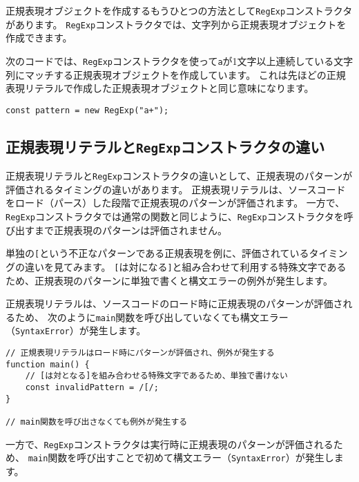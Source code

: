 正規表現オブジェクトを作成するもうひとつの方法として\texttt{RegExp}コンストラクタがあります。
\texttt{RegExp}コンストラクタでは、文字列から正規表現オブジェクトを作成できます。

次のコードでは、\texttt{RegExp}コンストラクタを使って\texttt{a}が1文字以上連続している文字列にマッチする正規表現オブジェクトを作成しています。
これは先ほどの正規表現リテラルで作成した正規表現オブジェクトと同じ意味になります。

\begin{lstlisting}
const pattern = new RegExp("a+");
\end{lstlisting}

\hypertarget{difference-regexp-literal-regexp-constructor}{%
\subsection{\texorpdfstring{正規表現リテラルと\texttt{RegExp}コンストラクタの違い}{正規表現リテラルとRegExpコンストラクタの違い}}\label{difference-regexp-literal-regexp-constructor}}

正規表現リテラルと\texttt{RegExp}コンストラクタの違いとして、正規表現のパターンが評価されるタイミングの違いがあります。
正規表現リテラルは、ソースコードをロード（パース）した段階で正規表現のパターンが評価されます。
一方で、\texttt{RegExp}コンストラクタでは通常の関数と同じように、\texttt{RegExp}コンストラクタを呼び出すまで正規表現のパターンは評価されません。

単独の\texttt{[}という不正なパターンである正規表現を例に、評価されているタイミングの違いを見てみます。
\texttt{[}は対になる\texttt{]}と組み合わせて利用する特殊文字であるため、正規表現のパターンに単独で書くと構文エラーの例外が発生します。

正規表現リテラルは、ソースコードのロード時に正規表現のパターンが評価されるため、
次のように\texttt{main}関数を呼び出していなくても構文エラー（\texttt{SyntaxError}）が発生します。

\begin{lstlisting}
// 正規表現リテラルはロード時にパターンが評価され、例外が発生する
function main() {
    // [は対となる]を組み合わせる特殊文字であるため、単独で書けない
    const invalidPattern = /[/;
}

// main関数を呼び出さなくても例外が発生する
\end{lstlisting}

一方で、\texttt{RegExp}コンストラクタは実行時に正規表現のパターンが評価されるため、
\texttt{main}関数を呼び出すことで初めて構文エラー（\texttt{SyntaxError}）が発生します。

